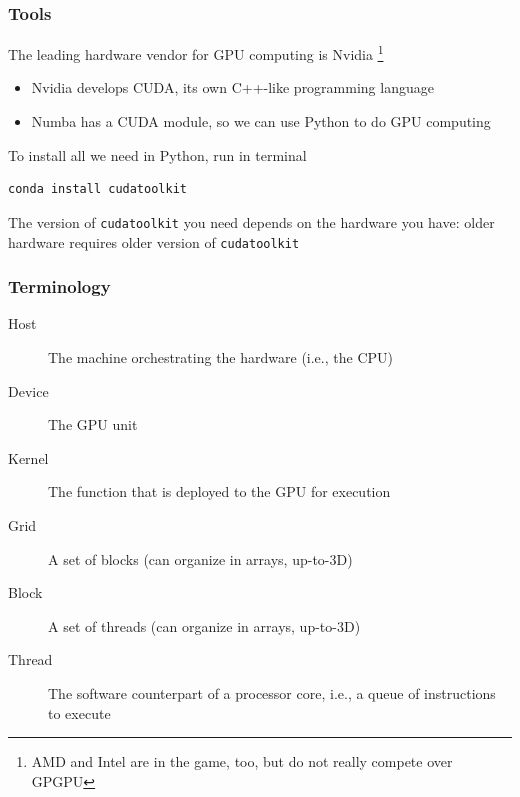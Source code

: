 \documentclass[10pt, aspectratio=1610]{beamer}
\begin{document}
\begin{frame}
\begin{columns}
\begin{column}{0.35\textwidth}
\begin{figure}
      \end{figure}
    \end{column}
  \end{columns}

\end{frame}

\begin{frame}[fragile]
  \frametitle{Tools}

  The leading hardware vendor for GPU computing is Nvidia%
    \footnote{
      AMD and Intel are in the game, too, but do not really compete over GPGPU
    }

  \begin{itemize}
    \item Nvidia develops CUDA, its own C++-like programming language
    \item Numba has a CUDA module, so we can use Python to do GPU computing
  \end{itemize}

  \vfill
  To install all we need in Python, run in terminal
  \begin{lstlisting}[language=bash]
    conda install cudatoolkit
  \end{lstlisting}

  The version of \texttt{cudatoolkit} you need depends on the hardware you have: older hardware requires older version of \texttt{cudatoolkit}

\end{frame}

\begin{frame}
  \frametitle{Terminology}

  \begin{description}
    \item[Host] The machine orchestrating the hardware (i.e., the CPU)
    \item[Device] The GPU unit
    \item[Kernel] The function that is deployed to the GPU for execution
    \item[Grid] A set of blocks (can organize in arrays, up-to-3D)
    \item[Block] A set of threads (can organize in arrays, up-to-3D)
    \item[Thread] The software counterpart of a processor core, i.e., a queue of instructions to execute
  \end{description}

\end{frame}
\end{document}
